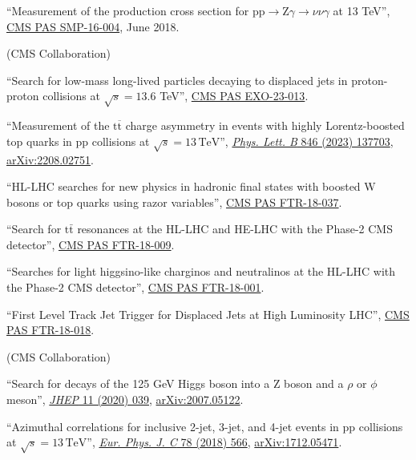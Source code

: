 \begin{description}[leftmargin=12pt,font=\normalfont\textit]
\begin{description}[leftmargin=12pt,font=\normalfont,labelsep=0em]
\item ``Measurement of the production cross section for $\text{p}\text{p} \to \text{Z}\gamma \to \nu\nu\gamma$ at 13 TeV'', \href{https://cds.cern.ch/record/2204922}{CMS PAS SMP-16-004}, June 2018.
\end{description}
\item[CMS Certified Language Editor (CCLE):] (CMS Collaboration)
\begin{description}[leftmargin=12pt,font=\normalfont,labelsep=0em]
\item ``Search for low-mass long-lived particles decaying to displaced jets in proton-proton collisions at $\sqrt{s} = 13.6$ TeV'', \href{http://cds.cern.ch/record/2893044}{CMS PAS EXO-23-013}.
\item ``Measurement of the $\text{t}\overline{\text{t}}$ charge asymmetry in events with highly Lorentz-boosted top quarks in pp collisions at $\sqrt{s} = 13\,\text{TeV}$'', \href{https://doi.org/10.1016/j.physletb.2023.137703}{\emph{Phys. Lett. B} 846 (2023) 137703}, \href{https://arxiv.org/abs/2208.02751}{arXiv:2208.02751}.
\item ``HL-LHC searches for new physics in hadronic final states with boosted W bosons or top quarks using razor variables'', \href{https://cds.cern.ch/record/2658262}{CMS PAS FTR-18-037}.
\item ``Search for $\text{t}\bar{\text{t}}$ resonances at the HL-LHC and HE-LHC with the Phase-2 CMS detector'', \href{https://cds.cern.ch/record/2649032}{CMS PAS FTR-18-009}.
\item ``Searches for light higgsino-like charginos and neutralinos at the HL-LHC with the Phase-2 CMS detector'', \href{https://cds.cern.ch/record/2648538}{CMS PAS FTR-18-001}.
\item ``First Level Track Jet Trigger for Displaced Jets at High Luminosity LHC'', \href{https://cds.cern.ch/record/2647987}{CMS PAS FTR-18-018}.
\end{description}
\item[FNAL institutional review leader:] (CMS Collaboration)
\begin{description}[leftmargin=12pt,font=\normalfont,labelsep=0em]
\item ``Search for decays of the 125 GeV Higgs boson into a Z boson and a $\rho$ or $\phi$ meson'', \href{https://doi.org/10.1007/JHEP11(2020)039}{\emph{JHEP} 11 (2020) 039}, \href{https://arxiv.org/abs/2007.05122}{arXiv:2007.05122}.
\item ``Azimuthal correlations for inclusive 2-jet, 3-jet, and 4-jet events in pp collisions at $\sqrt{s} = 13\,\text{TeV}$'', \href{http://dx.doi.org/10.1140/epjc/s10052-018-6033-4}{\emph{Eur. Phys. J. C} 78 (2018) 566}, \href{http://arxiv.org/abs/1712.05471}{arXiv:1712.05471}.

\end{description}
\end{description}
